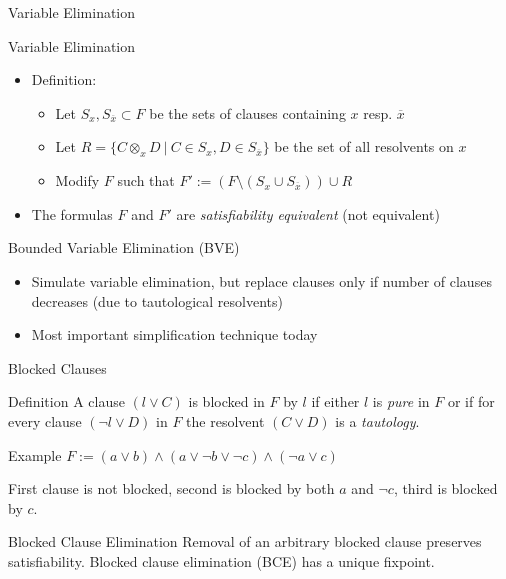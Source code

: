 \documentclass[t]{sdqbeamer}
\begin{document}
    
    \begin{frame}{Variable Elimination}
    \begin{block}{Variable Elimination}
    \begin{itemize}
    \item Definition:
    \begin{itemize}
    \item Let $S_x, S_{\overline x} \subset F$ be the sets of clauses containing $x$ resp. ${\overline x}$
    \item Let $R = \{ C \otimes_x D ~|~ C \in S_x, D \in S_{\overline x} \}$ be the set of all resolvents on $x$
    \item Modify $F$ such that $F' := (F \setminus (S_x \cup S_{\overline x})) \cup R$
    \end{itemize}
    \item The formulas $F$ and $F'$ are \emph{satisfiability equivalent} (not equivalent)
    \end{itemize}
    \end{block}
    
    \begin{block}{Bounded Variable Elimination (BVE)}
    \begin{itemize}
    \item Simulate variable elimination, but replace clauses only if number of clauses decreases (due to tautological resolvents) 
    \item Most important simplification technique today
    \end{itemize}
    \end{block}
    \end{frame}
    
    
    \begin{frame}{Blocked Clauses}
    \begin{block}{Definition}
    A clause $(l \lor C)$ is blocked in $F$ by $l$ if either $l$ is \emph{pure} in $F$ or if for every clause $(\lnot l \lor D)$ in $F$ the resolvent $(C \lor D)$ is a \emph{tautology}.
    \end{block}
    
    \begin{exampleblock}{Example}
    $F := (a \lor b) \land (a \lor \lnot b \lor \lnot c) \land (\lnot a \lor c)$
    
    First clause is not blocked, second is blocked by both $a$ and $\lnot c$, third is blocked by $c$.
    \end{exampleblock}
    
    \begin{block}{Blocked Clause Elimination}
    Removal of an arbitrary blocked clause preserves satisfiability. Blocked clause elimination (BCE) has a unique fixpoint.
    \end{block}
    \end{frame}
    
\end{document}
